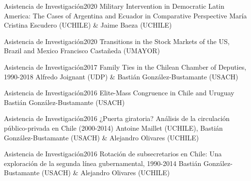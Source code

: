 





\begin{projects}

	\project
	{Asistencia de Investigación}{2020}
	{Military Intervention in Democratic Latin America: The Cases of Argentina and Ecuador in Comparative Perspective}
	{María Cristina Escudero (UCHILE) \& Jaime Baeza (UCHILE)}

\end{projects}

\begin{projects}

	\project
	{Asistencia de Investigación}{2020}
	{Transitions in the Stock Markets of the US, Brazil and Mexico}
	{Francisco Castañeda (UMAYOR)}

	\project
	{Asistencia de Investigación}{2017}
	{Family Ties in the Chilean Chamber of Deputies, 1990-2018}
	{Alfredo Joignant (UDP) \& Bastián González-Bustamante (USACH)}

	\project
	{Asistencia de Investigación}{2016}
	{Elite-Mass Congruence in Chile and Uruguay}
	{Bastián González-Bustamante (USACH)}
	
	\project
	{Asistencia de Investigación}{2016}
	{¿Puerta giratoria? Análisis de la circulación público-privada en Chile (2000-2014)}
	{Antoine Maillet (UCHILE), Bastián González-Bustamante (USACH) \& Alejandro Olivares (UCHILE)}

	\project
	{Asistencia de Investigación}{2016}
	{Rotación de subsecretarios en Chile: Una exploración de la segunda línea gubernamental, 1990-2014}
	{Bastián González-Bustamante (USACH) \& Alejandro Olivares (UCHILE)}
	
\end{projects}
